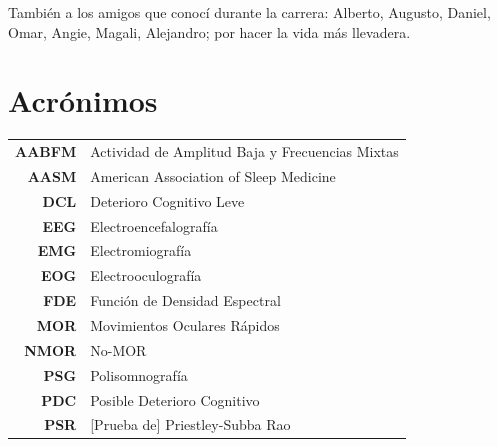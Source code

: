 \documentclass[12pt,letterpaper]{book}
\begin{document}
También a los amigos que conocí durante la carrera: Alberto, Augusto, Daniel, Omar, Angie, Magali, 
Alejandro; por hacer la vida más llevadera.


\chapter*{Acrónimos}

\begin{tabular}{rl}
\textbf{AABFM} & Actividad de Amplitud Baja y Frecuencias Mixtas
\\
\textbf{AASM} & American Association of Sleep Medicine
\\
\textbf{DCL} & Deterioro Cognitivo Leve
\\
\textbf{EEG} & Electroencefalografía
\\
\textbf{EMG} & Electromiografía
\\
\textbf{EOG} & Electrooculografía
\\
\textbf{FDE} & Función de Densidad Espectral
\\
\textbf{MOR} & Movimientos Oculares Rápidos
\\
\textbf{NMOR}& No-MOR
\\
\textbf{PSG} & Polisomnografía
\\
\textbf{PDC} & Posible Deterioro Cognitivo
\\
\textbf{PSR} & [Prueba de] Priestley-Subba Rao
\\
\end{tabular}

\newpage


\thispagestyle{empty}

\tableofcontents
\newpage

\listoffigures
\listoftables
\newpage

\end{document}
